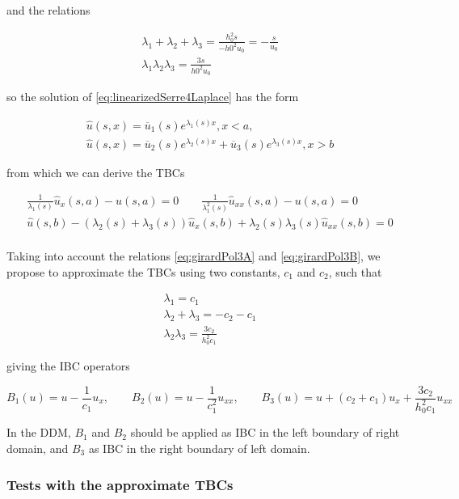 \noindent and the relations

\begin{gather}
	\label{eq:girardPol3A}
		\lambda_1 + \lambda_2 + \lambda_3 = \frac{h_0^2s}{- h0^2u_0} = -\frac{s}{u_0} \\
	\label{eq:girardPol3B}
		\lambda_1 \lambda_2 \lambda_3 = \frac{3s}{h0^2u_0}
\end{gather}

\noindent so the solution of \eqref{eq:linearizedSerre4Laplace} has the form

\begin{gather*}
	\hat{u}(s,x) = \overline{u}_1(s)e^{\lambda_1(s)x}, x < a, \\
	\hat{u}(s,x) = \overline{u}_2(s)e^{\lambda_2(s)x} + \overline{u}_3(s)e^{\lambda_3(s)x}, x > b
\end{gather*}

\noindent from which we can derive the TBCs

\begin{gather*}
\frac{1}{\lambda_1(s)}\hat{u}_{x}(s,a) - u(s,a) = 0 \qquad \frac{1}{\lambda_1^2(s)}\hat{u}_{xx}(s,a) - u(s,a) = 0 \\
\hat{u}(s,b) - (\lambda_2(s) + \lambda_3(s))\hat{u}_x(s,b) + \lambda_2(s) \lambda_3(s)\hat{u}_{xx}(s,b) = 0 \\
\end{gather*}

\indent Taking into account the relations \eqref{eq:girardPol3A} and \eqref{eq:girardPol3B}, we propose to approximate the TBCs using two constants, $c_1$ and $c_2$, such that

\begin{gather*}
	\lambda_1 = c_1 \\
	\lambda_2 + \lambda_3 = - c_2 - c_1 \\
	\lambda_2 \lambda_3 = \frac{3c_2}{h_0^2c_1}
\end{gather*}

\noindent giving the IBC operators

\begin{equation}
	B_1(u) = u - \frac{1}{c_1}u_{x}, \qquad B_2(u) = u - \frac{1}{c_1^2}u_{xx}, \qquad B_3(u) = u + (c_2+c_1)u_x + \frac{3c_2}{h_0^2c_1} u_{xx}
\end{equation}

\indent In the DDM, $B_1$ and $B_2$ should be applied as IBC in the left boundary of right domain, and $B_3$ as IBC in the right boundary of left domain.


\subsubsection{Tests with the approximate TBCs}

